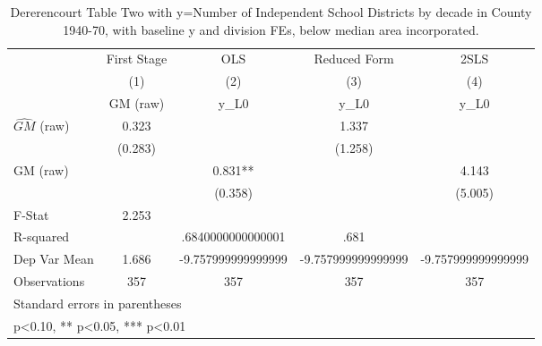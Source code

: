 \begin{table}[htbp]\centering
\def\sym#1{\ifmmode^{#1}\else\(^{#1}\)\fi}
\caption{Dererencourt Table Two with y=Number of Independent School Districts by decade in County 1940-70, with baseline y and division FEs, below median area incorporated.}
\begin{tabular}{l*{4}{c}}
\toprule
                    & First Stage   &         OLS   &Reduced Form   &        2SLS   \\
                    &\multicolumn{1}{c}{(1)}&\multicolumn{1}{c}{(2)}&\multicolumn{1}{c}{(3)}&\multicolumn{1}{c}{(4)}\\
                    &\multicolumn{1}{c}{GM  (raw)}&\multicolumn{1}{c}{y\_L0}&\multicolumn{1}{c}{y\_L0}&\multicolumn{1}{c}{y\_L0}\\
\midrule
$\hat{GM}$ (raw)    &       0.323   &               &       1.337   &               \\
                    &     (0.283)   &               &     (1.258)   &               \\
\addlinespace
GM  (raw)           &               &       0.831** &               &       4.143   \\
                    &               &     (0.358)   &               &     (5.005)   \\
\midrule
F-Stat              &       2.253   &               &               &               \\
R-squared           &               &.6840000000000001   &        .681   &               \\
Dep Var Mean        &       1.686   &-9.757999999999999   &-9.757999999999999   &-9.757999999999999   \\
Observations        &         357   &         357   &         357   &         357   \\
\bottomrule
\multicolumn{5}{l}{\footnotesize Standard errors in parentheses}\\
\multicolumn{5}{l}{\footnotesize * p<0.10, ** p<0.05, *** p<0.01}\\
\end{tabular}
\end{table}
